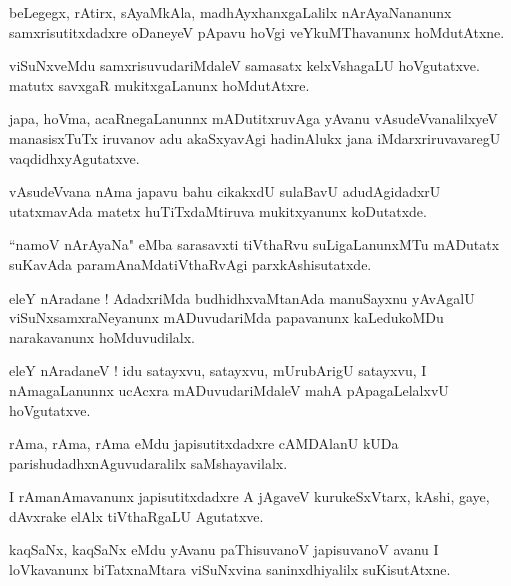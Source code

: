 \documentclass{article}
\begin{document}
\begin{mn}%
beLegegx, rAtirx, sAyaMkAla, madhAyxhanxgaLalilx nArAyaNananunx samxrisutitxdadxre oDaneyeV pApavu 
hoVgi veYkuMThavanunx hoMdutAtxne.
\end{mn}

\begin{mn}%
viSuNxveMdu samxrisuvudariMdaleV samasatx kelxVshagaLU hoVgutatxve. matutx savxgaR mukitxgaLanunx 
hoMdutAtxre.
\end{mn}

\begin{mn}%
japa, hoVma, acaRnegaLanunnx mADutitxruvAga yAvanu vAsudeVvanalilxyeV manasisxTuTx iruvanov adu 
akaSxyavAgi hadinAlukx jana iMdarxriruvavaregU vaqdidhxyAgutatxve.
\end{mn}

\begin{mn}%
vAsudeVvana nAma japavu bahu cikakxdU sulaBavU adudAgidadxrU utatxmavAda matetx huTiTxdaMtiruva 
mukitxyanunx koDutatxde.
\end{mn}

\begin{mn}%
``namoV nArAyaNa" eMba sarasavxti tiVthaRvu suLigaLanunxMTu mADutatx suKavAda 
paramAnaMdatiVthaRvAgi parxkAshisutatxde.
\end{mn}

\begin{mn}%
eleY nAradane ! AdadxriMda budhidhxvaMtanAda manuSayxnu yAvAgalU viSuNxsamxraNeyanunx mADuvudariMda 
papavanunx kaLedukoMDu narakavanunx hoMduvudilalx.
\end{mn}

\begin{mn}%
eleY nAradaneV ! idu satayxvu, satayxvu, mUrubArigU satayxvu, I nAmagaLanunnx ucAcxra 
mADuvudariMdaleV mahA pApagaLelalxvU hoVgutatxve.
\end{mn}

\begin{mn}%
rAma, rAma, rAma eMdu japisutitxdadxre cAMDAlanU kUDa parishudadhxnAguvudaralilx saMshayavilalx.
\end{mn}

\begin{mn}%
I rAmanAmavanunx japisutitxdadxre A jAgaveV kurukeSxVtarx, kAshi, gaye, dAvxrake elAlx tiVthaRgaLU 
Agutatxve.
\end{mn}

\begin{mn}%
kaqSaNx, kaqSaNx eMdu yAvanu paThisuvanoV japisuvanoV avanu I loVkavanunx biTatxnaMtara viSuNxvina 
saninxdhiyalilx suKisutAtxne.
\end{mn}
\end{document}

